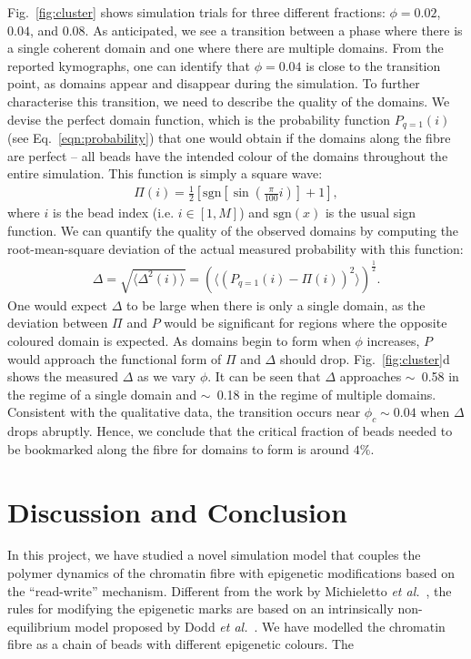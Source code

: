 \documentclass[12pt]{article}
\newcommand{\etal}{\emph{et al.}}
\begin{document}
Fig.~\ref{fig:cluster} shows simulation trials for three different fractions: $\phi = 0.02$, $0.04$, and $0.08$. As anticipated, we see a transition between a phase where there is a single coherent domain and one where there are multiple domains. From the reported kymographs, one can identify that $\phi = 0.04$ is close to the transition point, as domains appear and disappear during the simulation. To further characterise this transition, we need to describe the quality of the domains. We devise the perfect domain function, which is the probability function $P_{q=1}(i)$ (see Eq.~\ref{eqn:probability}) that one would obtain if the domains along the fibre are perfect -- all beads have the intended colour of the domains throughout the entire simulation. This function is simply a square wave:
\begin{eqnarray}
\Pi(i) = \frac{1}{2}\left[\textrm{sgn}\left[\sin\left(\frac{\pi}{100}i\right)\right] + 1 \right],
\end{eqnarray}
where $i$ is the bead index (i.e. $i \in [1, M]$) and $\textrm{sgn}(x)$ is the usual sign function. We can quantify the quality of the observed domains by computing the root-mean-square deviation of the actual measured probability with this function:
\begin{eqnarray}
\Delta = \sqrt{\langle\Delta^2(i)\rangle} = \left(\langle\left(P_{q=1}(i) - \Pi(i)\right)^2\rangle\right)^{\frac{1}{2}}.
\end{eqnarray}
One would expect $\Delta$ to be large when there is only a single domain, as the deviation between $\Pi$ and $P$ would be significant for regions where the opposite coloured domain is expected. As domains begin to form when $\phi$ increases, $P$ would approach the functional form of $\Pi$ and $\Delta$ should drop. Fig.~\ref{fig:cluster}d shows the measured $\Delta$ as we vary $\phi$. It can be seen that $\Delta$ approaches $\sim$~0.58 in the regime of a single domain and $\sim$~0.18 in the regime of multiple domains. Consistent with the qualitative data, the transition occurs near $\phi_c \sim 0.04$ when $\Delta$ drops abruptly. Hence, we conclude that the critical fraction of beads needed to be bookmarked along the fibre for domains to form is around $4\%$.

\FloatBarrier
\pagebreak
\section{Discussion and Conclusion}
In this project, we have studied a novel simulation model that couples the polymer dynamics of the chromatin fibre with epigenetic modifications based on the ``read-write'' mechanism. Different from the work by Michieletto \etal~\cite{michieletto2016}, the rules for modifying the epigenetic marks are based on an intrinsically non-equilibrium model proposed by Dodd \etal~\cite{dodd2007}. We have modelled the chromatin fibre as a chain of beads with different epigenetic colours. The 
\end{document}
